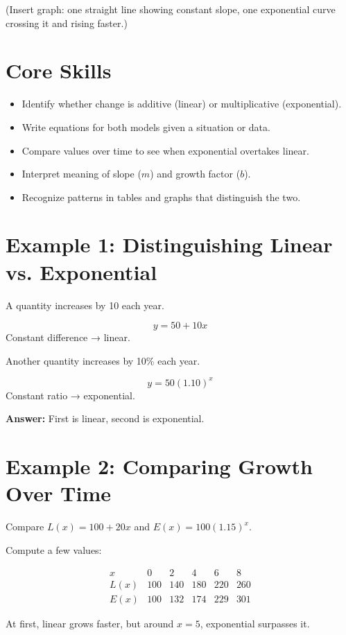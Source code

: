 \documentclass[12pt]{article}
\begin{document}
(Insert graph: one straight line showing constant slope, one exponential curve crossing it and rising faster.)

\section*{Core Skills}
\begin{itemize}
  \item Identify whether change is additive (linear) or multiplicative (exponential).
  \item Write equations for both models given a situation or data.
  \item Compare values over time to see when exponential overtakes linear.
  \item Interpret meaning of slope (\(m\)) and growth factor (\(b\)).
  \item Recognize patterns in tables and graphs that distinguish the two.
\end{itemize}

\section*{Example 1: Distinguishing Linear vs. Exponential}

A quantity increases by 10 each year.

\[
y = 50 + 10x
\]
Constant difference → linear.

Another quantity increases by 10\% each year.

\[
y = 50(1.10)^x
\]
Constant ratio → exponential.

\textbf{Answer:} First is linear, second is exponential.

\section*{Example 2: Comparing Growth Over Time}

Compare \(L(x) = 100 + 20x\) and \(E(x) = 100(1.15)^x.\)

Compute a few values:

\[
\begin{array}{c|ccccc}
x & 0 & 2 & 4 & 6 & 8 \\ \hline
L(x) & 100 & 140 & 180 & 220 & 260 \\
E(x) & 100 & 132 & 174 & 229 & 301
\end{array}
\]

At first, linear grows faster, but around \(x = 5\), exponential surpasses it.
\end{document}
